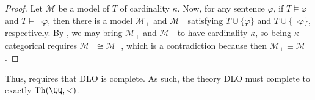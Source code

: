 \documentclass[../notes.tex]{subfiles}
\begin{document}
\begin{proof}
	Let $\mathcal M$ be a model of $T$ of cardinality $\kappa$. Now, for any sentence $\varphi$, if $T\models\varphi$ and $T\models\lnot\varphi$, then there is a model $\mathcal M_+$ and $\mathcal M_-$ satisfying $T\cup\{\varphi\}$ and $T\cup\{\lnot\varphi\}$, respectively. By , we may bring $\mathcal M_+$ and $\mathcal M_-$ to have cardinality $\kappa$, so being $\kappa$-categorical requires $\mathcal M_+\cong\mathcal M_-$, which is a contradiction because then $\mathcal M_+\equiv\mathcal M_-$.
\end{proof}
\begin{example}
	Thus,  requires that $\mathrm{DLO}$ is complete. As such, the theory $\mathrm{DLO}$ must complete to exactly $\mathrm{Th}(\QQ,<)$.
\end{example}
\end{document}
